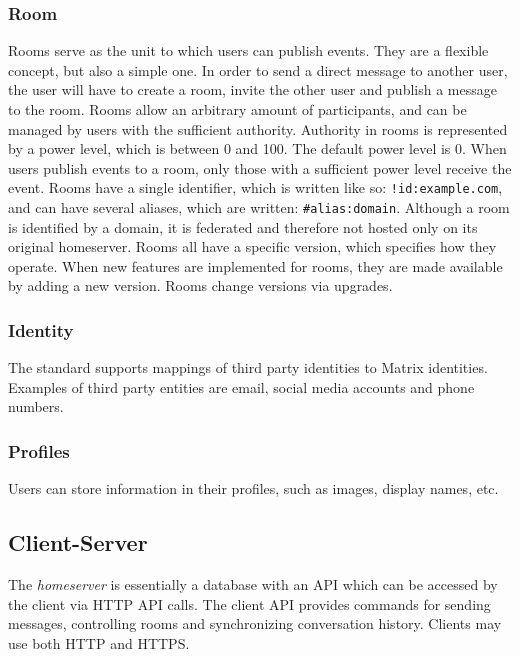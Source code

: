 \subsubsection{Room}
Rooms serve as the unit to which users can publish events.
They are a flexible concept, but also a simple one.
In order to send a direct message to another user, the user will have to create a room, invite the other user and publish a message to the room.
Rooms allow an arbitrary amount of participants, and can be managed by users with the sufficient authority.
Authority in rooms is represented by a power level, which is between 0 and 100.
The default power level is 0.
When users publish events to a room, only those with a sufficient power level receive the event.
Rooms have a single identifier, which is written like so: \texttt{!id:example.com}, and can have several aliases, which are written: \texttt{\#alias:domain}.
Although a room is identified by a domain, it is federated and therefore not hosted only on its original homeserver.
Rooms all have a specific version, which specifies how they operate.
When new features are implemented for rooms, they are made available by adding a new version.
Rooms change versions via upgrades.

\subsubsection{Identity}
The standard supports mappings of third party identities to Matrix identities.
Examples of third party entities are email, social media accounts and phone numbers.

\subsubsection{Profiles}
Users can store information in their profiles, such as images, display names, etc.

\subsection{Client-Server}
The \textit{homeserver} is essentially a database with an \ac{API} which can be accessed by the client via \ac{HTTP} \ac{API} calls.
The client \ac{API} provides commands for sending messages, controlling rooms and synchronizing conversation history.
Clients may use both \ac{HTTP} and \ac{HTTPS}.

